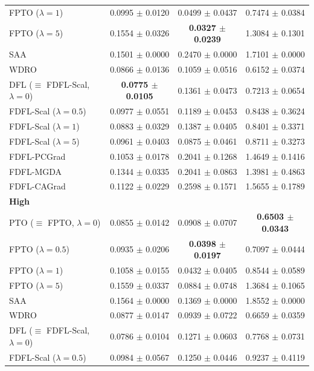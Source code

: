 \documentclass[ijoc,sglanonrev]{informs4}
\begin{document}
\begin{table}[htbp]
\begin{tabular}{lccc}
FPTO ($\lambda=1$) 
    & 0.0995 $\pm$ 0.0120 & 0.0499 $\pm$ 0.0437 & 0.7474 $\pm$ 0.0384 \\
FPTO ($\lambda=5$) 
    & 0.1554 $\pm$ 0.0326 & \textbf{0.0327 $\pm$ 0.0239} & 1.3084 $\pm$ 0.1301 \\
SAA 
    & 0.1501 $\pm$ 0.0000 & 0.2470 $\pm$ 0.0000 & 1.7101 $\pm$ 0.0000 \\
WDRO 
    & 0.0866 $\pm$ 0.0136 & 0.1059 $\pm$ 0.0516 & 0.6152 $\pm$ 0.0374 \\
DFL ($\equiv$ FDFL-Scal, $\lambda=0$) 
    & \textbf{0.0775 $\pm$ 0.0105} & 0.1361 $\pm$ 0.0473 & 0.7213 $\pm$ 0.0654 \\
FDFL-Scal ($\lambda=0.5$) 
    & 0.0977 $\pm$ 0.0551 & 0.1189 $\pm$ 0.0453 & 0.8438 $\pm$ 0.3624 \\
FDFL-Scal ($\lambda=1$) 
    & 0.0883 $\pm$ 0.0329 & 0.1387 $\pm$ 0.0405 & 0.8401 $\pm$ 0.3371 \\
FDFL-Scal ($\lambda=5$) 
    & 0.0961 $\pm$ 0.0403 & 0.0875 $\pm$ 0.0461 & 0.8711 $\pm$ 0.3273 \\
FDFL-PCGrad 
    & 0.1053 $\pm$ 0.0178 & 0.2041 $\pm$ 0.1268 & 1.4649 $\pm$ 0.1416 \\
FDFL-MGDA 
    & 0.1344 $\pm$ 0.0335 & 0.2041 $\pm$ 0.0863 & 1.3981 $\pm$ 0.4863 \\
FDFL-CAGrad 
    & 0.1122 $\pm$ 0.0229 & 0.2598 $\pm$ 0.1571 & 1.5655 $\pm$ 0.1789 \\
\midrule
\multicolumn{4}{l}{\textbf{High}} \\
PTO ($\equiv$ FPTO, $\lambda=0$) 
    & 0.0855 $\pm$ 0.0142 & 0.0908 $\pm$ 0.0707 & \textbf{0.6503 $\pm$ 0.0343} \\
FPTO ($\lambda=0.5$) 
    & 0.0935 $\pm$ 0.0206 & \textbf{0.0398 $\pm$ 0.0197} & 0.7097 $\pm$ 0.0444 \\
FPTO ($\lambda=1$) 
    & 0.1058 $\pm$ 0.0155 & 0.0432 $\pm$ 0.0405 & 0.8544 $\pm$ 0.0589 \\
FPTO ($\lambda=5$) 
    & 0.1559 $\pm$ 0.0337 & 0.0884 $\pm$ 0.0748 & 1.3684 $\pm$ 0.1065 \\
SAA 
    & 0.1564 $\pm$ 0.0000 & 0.1369 $\pm$ 0.0000 & 1.8552 $\pm$ 0.0000 \\
WDRO 
    & 0.0877 $\pm$ 0.0147 & 0.0939 $\pm$ 0.0722 & 0.6659 $\pm$ 0.0359 \\
DFL ($\equiv$ FDFL-Scal, $\lambda=0$) 
    & 0.0786 $\pm$ 0.0104 & 0.1271 $\pm$ 0.0603 & 0.7768 $\pm$ 0.0731 \\
FDFL-Scal ($\lambda=0.5$) 
    & 0.0984 $\pm$ 0.0567 & 0.1250 $\pm$ 0.0446 & 0.9237 $\pm$ 0.4119 \\

\end{tabular}
\end{table}
\end{document}
